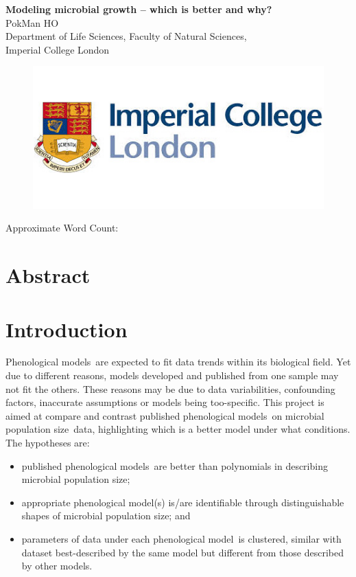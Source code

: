\documentclass[a4paper, 11pt]{article}
\title{\ReportTitle}
\author{\ReportAuthor\ (CID: 01786076)}
\date{}
\newcommand{\pml}{phenological model}
\newcommand{\pms}{phenological models}
\newcommand{\Pms}{Phenological models}
\newcommand{\ReportTitle}{Modeling microbial growth -- which is better and why?} %
\newcommand{\ReportAuthor}{PokMan HO}
\newcommand{\ReportAffil}{Department of Life Sciences, Faculty of Natural Sciences,\\Imperial College London}
\newcommand{\pop}{population size}
\begin{document}
	\begin{center}
		\Huge\textbf{\ReportTitle}\\
		\LARGE\ReportAuthor\\
		\Large\ReportAffil
	\end{center}
	\begin{figure}[h]
		\centering\includegraphics[width=\linewidth]{icl.jpg}
	\end{figure}
	\begin{flushright}
		\Large Approximate Word Count: %
	\end{flushright}
	\clearpage
	
	\maketitle
	\section*{Abstract}
	
	
	\section*{Introduction}
	\Pms\ are expected to fit data trends within its biological field.  Yet due to different reasons, models developed and published from one sample may not fit the others.  These reasons may be due to data variabilities, confounding factors, inaccurate assumptions or models being too-specific.  This project is aimed at compare and contrast published \pms\ on microbial \pop\ data, highlighting which is a better model under what conditions.  The hypotheses are:
	\begin{itemize}
		\item published \pms\ are better than polynomials in describing microbial \pop;
		\item appropriate \pml(s) is/are identifiable through distinguishable shapes of microbial \pop; and
		\item parameters of data under each \pml\ is clustered, similar with dataset best-described by the same model but different from those described by other models.
	\end{itemize}
	
\end{document}
